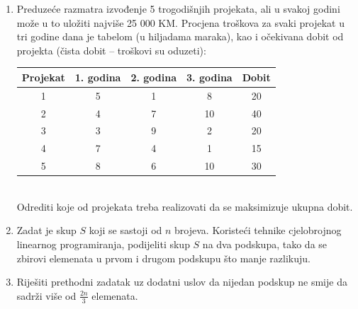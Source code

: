 \documentclass[a4paper, utf8, 11pt, colorlinks]{book}
\begin{document}
\begin{enumerate}
	
	\item Preduzeće  razmatra izvođenje 5 trogodišnjih projekata, ali u svakoj godini može u to uložiti najviše
	25 000 KM. Procjena troškova za svaki projekat u tri godine dana je tabelom (u hiljadama maraka), kao i
	očekivana dobit od projekta (čista dobit – troškovi su oduzeti):

	\begin{tabular}{|c|c|c|c|c|}
		\hline
		Projekat & 1. godina & 2. godina & 3. godina & Dobit \\
		\hline
		1 & 5 & 1 & 8 & 20 \\
		\hline
		2 & 4 & 7 & 10 & 40 \\
		\hline
		3 & 3 & 9 & 2 & 20 \\
		\hline
		4 & 7 & 4 & 1 & 15 \\
		\hline
		5 & 8 & 6 & 10 & 30 \\
		\hline
	\end{tabular}  \\
	Odrediti koje od projekata treba realizovati da se maksimizuje ukupna dobit.
	
	\item Zadat je skup $S$ koji se sastoji od $n$ brojeva. Koristeći tehnike cjelobrojnog linearnog programiranja, podijeliti skup $S$ na dva podskupa, tako da se zbirovi elemenata u prvom i drugom podskupu što manje razlikuju.
	
	\item Riješiti prethodni zadatak uz dodatni uslov da nijedan podskup ne smije da sadrži više od $\frac {2n}3$ elemenata.
	


\end{enumerate}
\end{document}
